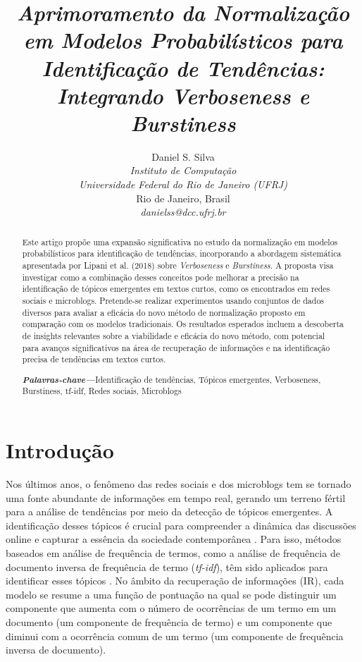 \documentclass[12pt]{article}
\begin{document}
\title{
    \textit{
        \textbf{
            Aprimoramento da Normalização em Modelos Probabilísticos para Identificação de Tendências: Integrando Verboseness e Burstiness
        }
    }
}

\author{Daniel S. Silva \\
    \textit{Instituto de Computação} \\
    \textit{Universidade Federal do Rio de Janeiro (UFRJ)}\\
    Rio de Janeiro, Brasil \\
    \textit{danielss@dcc.ufrj.br}
}

\maketitle

\begin{abstract}
Este artigo propõe uma expansão significativa no estudo da normalização em modelos probabilísticos para identificação de tendências, incorporando a abordagem sistemática apresentada por Lipani et al. (2018) sobre \textit{Verboseness} e \textit{Burstiness}. A proposta visa investigar como a combinação desses conceitos pode melhorar a precisão na identificação de tópicos emergentes em textos curtos, como os encontrados em redes sociais e microblogs. Pretende-se realizar experimentos usando conjuntos de dados diversos para avaliar a eficácia do novo método de normalização proposto em comparação com os modelos tradicionais. Os resultados esperados incluem a descoberta de insights relevantes sobre a viabilidade e eficácia do novo método, com potencial para avanços significativos na área de recuperação de informações e na identificação precisa de tendências em textos curtos.

\textbf{\textit{Palavras-chave---}}Identificação de tendências, Tópicos emergentes, Verboseness, Burstiness, tf-idf, Redes sociais, Microblogs
\end{abstract}

\section{Introdução}

Nos últimos anos, o fenômeno das redes sociais e dos microblogs tem se tornado uma fonte abundante de informações em tempo real, gerando um terreno fértil para a análise de tendências por meio da detecção de tópicos emergentes. A identificação desses tópicos é crucial para compreender a dinâmica das discussões online e capturar a essência da sociedade contemporânea \cite{Aiello2013}. Para isso, métodos baseados em análise de frequência de termos, como a análise de frequência de documento inversa de frequência de termo (\textit{tf-idf}), têm sido aplicados para identificar esses tópicos \cite{Benhardus2013}. No âmbito da recuperação de informações (IR), cada modelo se resume a uma função de pontuação na qual se pode distinguir um componente que aumenta com o número de ocorrências de um termo em um documento (um componente de frequência de termo) e um componente que diminui com a ocorrência comum de um termo (um componente de frequência inversa de documento).
\end{document}

